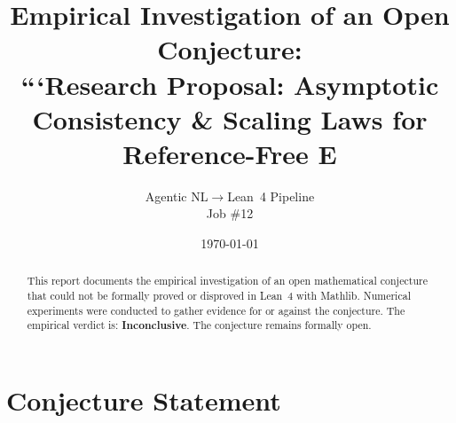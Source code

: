 \documentclass[11pt]{article}
\title{Empirical Investigation of an Open Conjecture:\\
```Research Proposal: Asymptotic Consistency \& Scaling Laws for Reference-Free E}
\author{Agentic NL$\to$Lean~4 Pipeline \\ \small Job \#12}
\date{\today}
\begin{document}
\maketitle

\begin{abstract}
This report documents the empirical investigation of an open mathematical conjecture
that could not be formally proved or disproved in Lean~4 with Mathlib.
Numerical experiments were conducted to gather evidence for or against the conjecture.
The empirical verdict is: \textbf{\textcolor{orange!80!black}{Inconclusive}}.
The conjecture remains formally open.
\end{abstract}

\section{Conjecture Statement}
\end{document}
